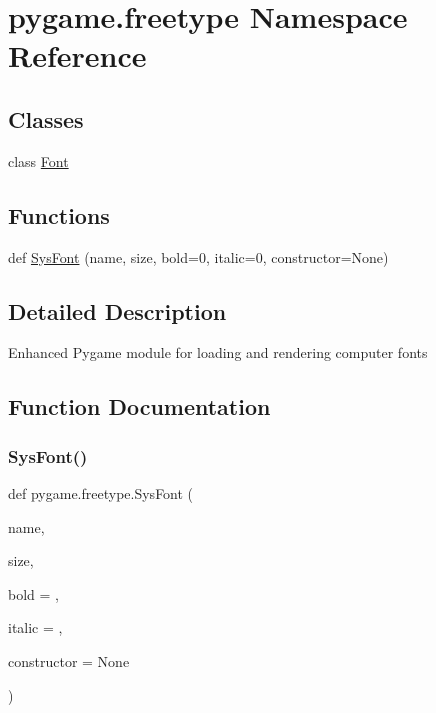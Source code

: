 \hypertarget{namespacepygame_1_1freetype}{}\section{pygame.\+freetype Namespace Reference}
\label{namespacepygame_1_1freetype}
\subsection*{Classes}
\begin{DoxyCompactItemize}
\item 
class \hyperlink{classpygame_1_1freetype_1_1_font}{Font}
\end{DoxyCompactItemize}
\subsection*{Functions}
\begin{DoxyCompactItemize}
\item 
def \hyperlink{namespacepygame_1_1freetype_aded24596d3050f50b95529ee850e1c03}{Sys\+Font} (name, size, bold=0, italic=0, constructor=None)
\end{DoxyCompactItemize}


\subsection{Detailed Description}
\begin{DoxyVerb}Enhanced Pygame module for loading and rendering computer fonts\end{DoxyVerb}
 

\subsection{Function Documentation}
\mbox{\label{namespacepygame_1_1freetype_aded24596d3050f50b95529ee850e1c03}} 
\subsubsection{\texorpdfstring{Sys\+Font()}{SysFont()}}
{\footnotesize\ttfamily def pygame.\+freetype.\+Sys\+Font (\begin{DoxyParamCaption}\item[{}]{name,  }\item[{}]{size,  }\item[{}]{bold = {},  }\item[{}]{italic = {},  }\item[{}]{constructor = {\ttfamily None} }\end{DoxyParamCaption})}


